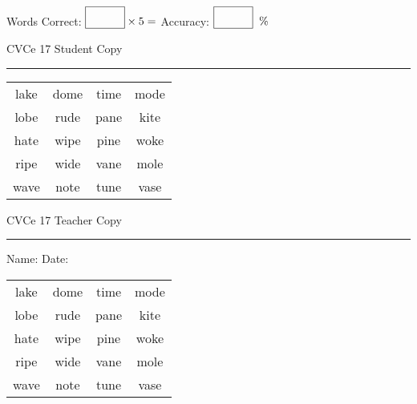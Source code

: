 \documentclass{memoir}
\begin{document}
\small

Words Correct: $\fbox{\phantom{\huge 100}} \times 5 = $ Accuracy: $\fbox{\phantom{\huge 100}}\;\; \%$ 

\vfill

\newpage


\footnotesize \noindent
CVCe 17 \hfill Student Copy
\smallskip
\hrule

\Large

\setlength{\tabcolsep}{14pt}
\def\arraystretch{2}

{\selectfont


\begin{vplace}[0.5]
\begin{center}
\begin{tabular}{cccc}
lake & dome & time & mode \\
lobe & rude & pane & kite \\
hate & wipe & pine & woke \\
ripe & wide & vane & mole \\
wave & note & tune & vase \\
\end{tabular}
\end{center}
\end{vplace}

}

\newpage

\footnotesize \noindent
CVCe 17 \hfill Teacher Copy
\smallskip
\hrule

\small

\vfill

\noindent
Name: \underline{\hspace{1.75in}} \hfill Date: \underline{\hspace{1in}}

\Large

{\selectfont


\begin{vplace}[0.5]
\begin{center}
\begin{tabular}{cccc}
lake & dome & time & mode \\
lobe & rude & pane & kite \\
hate & wipe & pine & woke \\
ripe & wide & vane & mole \\
wave & note & tune & vase \\
\end{tabular}
\end{center}
\end{vplace}



}
\end{document}
